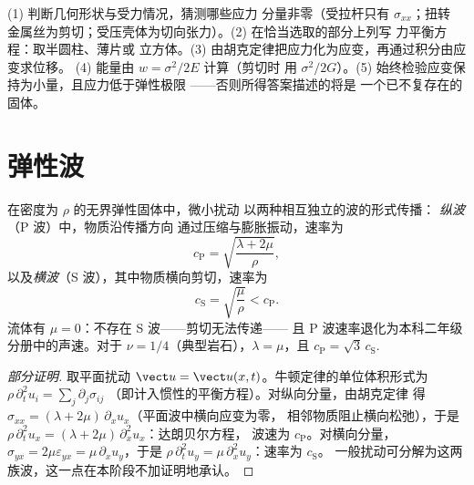 \begin{method}[小形变弹性问题的求解]\label{met:b3:continuum-elasticity:method}
(1) 判断几何形状与受力情况，猜测哪些应力
分量非零（受拉杆只有 $\sigma_{xx}$；扭转
金属丝为剪切；受压壳体为切向张力）。(2) 在恰当选取的部分上列写
力平衡方程：取半圆柱、薄片或
立方体。(3) 由胡克定律把应力化为应变，再通过积分由应变求位移。
(4) 能量由 $w = \sigma^2/2E$ 计算（剪切时
用 $\sigma^2/2G$）。(5) 始终检验应变保持为小量，且应力低于弹性极限
——否则所得答案描述的将是
一个已不复存在的固体。
\end{method}

\section{弹性波}

\begin{proposition}[固体中的两类波]\label{prop:b3:continuum-elasticity:waves}
在密度为 $\rho$ 的无界弹性固体中，微小扰动
以两种相互独立的波的形式传播：
\emph{纵波}（P 波）中，物质沿传播方向
通过压缩与膨胀振动，速率为
\[
c_{\text{P}} = \sqrt{\frac{\lambda + 2\mu}{\rho}} ,
\]
以及\emph{横波}（S 波），其中物质横向剪切，速率为
\[
c_{\text{S}} = \sqrt{\frac{\mu}{\rho}} < c_{\text{P}} .
\]
流体有 $\mu = 0$：不存在 S 波——剪切无法传递——
且 P 波速率退化为本科二年级分册中的声速。对于
$\nu = 1/4$（典型岩石），$\lambda = \mu$，且 $c_{\text{P}} =
\sqrt3\,c_{\text{S}}$.
\end{proposition}

\begin{proof}[部分证明]
取平面扰动 $\vect u = \vect u(x, t)$。牛顿定律的单位体积形式为
$\rho\,\partial_t^2u_i = \sum_j\partial_j\sigma_{ij}$
（即计入惯性的平衡方程）。对纵向分量，由胡克定律
得 $\sigma_{xx} = (\lambda +
2\mu)\,\partial_xu_x$（平面波中横向应变为零，
相邻物质阻止横向松弛），于是
$\rho\,\partial_t^2u_x = (\lambda + 2\mu)\,\partial_x^2u_x$：达朗贝尔方程，
波速为 $c_{\text{P}}$。对横向分量，$\sigma_{yx} =
2\mu\varepsilon_{yx} = \mu\,\partial_xu_y$，于是
$\rho\,\partial_t^2u_y = \mu\,\partial_x^2u_y$：速率为 $c_{\text{S}}$。
一般扰动可分解为这两族波，这一点在本阶段不加证明地承认。
\end{proof}

